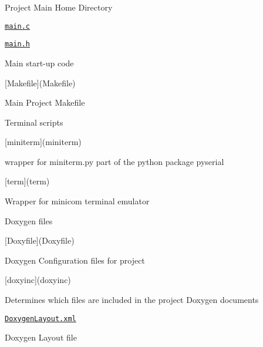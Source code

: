 \begin{DoxyItemize}
\item Project Main Home Directory
\begin{DoxyItemize}
\item \href{main.c}{\tt main.\+c}
\item \href{main.h}{\tt main.\+h}
\begin{DoxyItemize}
\item Main start-\/up code
\end{DoxyItemize}
\item \mbox{[}Makefile\mbox{]}(Makefile)
\begin{DoxyItemize}
\item Main Project Makefile
\end{DoxyItemize}
\end{DoxyItemize}
\item Terminal scripts
\begin{DoxyItemize}
\item \mbox{[}miniterm\mbox{]}(miniterm)
\begin{DoxyItemize}
\item wrapper for miniterm.\+py part of the python package pyserial
\end{DoxyItemize}
\item \mbox{[}term\mbox{]}(term)
\begin{DoxyItemize}
\item Wrapper for minicom terminal emulator
\end{DoxyItemize}
\end{DoxyItemize}
\item Doxygen files
\begin{DoxyItemize}
\item \mbox{[}Doxyfile\mbox{]}(Doxyfile)
\begin{DoxyItemize}
\item Doxygen Configuration files for project
\end{DoxyItemize}
\item \mbox{[}doxyinc\mbox{]}(doxyinc)
\begin{DoxyItemize}
\item Determines which files are included in the project Doxygen documents
\end{DoxyItemize}
\item \href{DoxygenLayout.xml}{\tt Doxygen\+Layout.\+xml}
\begin{DoxyItemize}
\item Doxygen Layout file
\end{DoxyItemize}

\end{DoxyItemize}
\end{DoxyItemize}
